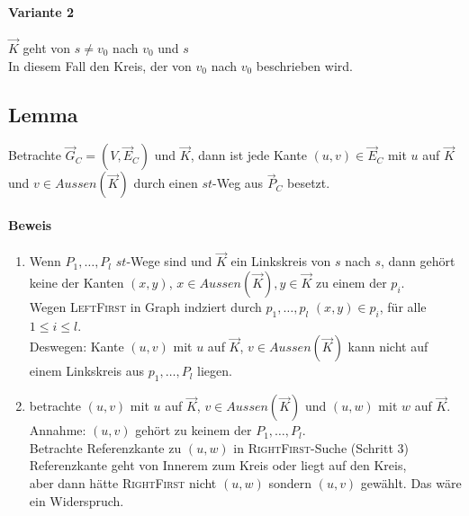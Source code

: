 \documentclass{article}
\begin{document}
\paragraph{Variante 2}
$\overrightarrow{K}$ geht von $s \neq v_0$ nach $v_0$ und $s$\\
In diesem Fall den Kreis, der von $v_0$ nach $v_0$ beschrieben wird.

\subsection{Lemma}
Betrachte $\overrightarrow{G}_C = (V,\overrightarrow{E}_C)$ und $\overrightarrow{K}$, dann ist jede Kante $(u,v) \in \overrightarrow{E}_C$ mit $u$ auf $\overrightarrow{K}$ und $v \in Aussen(\overrightarrow{K})$ durch einen $st$-Weg aus $\overrightarrow{P}_C$ besetzt.

\paragraph{Beweis}
\begin{enumerate}
	\item Wenn $P_1,\ldots, P_l$ $st$-Wege sind und $\overrightarrow{K}$ ein Linkskreis von $s$ nach $s$, dann gehört keine der Kanten $(x,y)$, $x \in Aussen(\overrightarrow{K}), y \in \overrightarrow{K}$ zu einem der $p_i$.\\
	Wegen \textsc{LeftFirst} in Graph indziert durch $p_1,\ldots, p_l$ $(x,y) \in p_i$, für alle $1 \leq i \leq l$.\\
	Deswegen: Kante $(u,v)$ mit $u$ auf $\overrightarrow{K}$, $v \in Aussen(\overrightarrow{K})$ kann nicht auf einem Linkskreis aus $p_1,\ldots, P_l$ liegen.
	
	\item betrachte $(u,v)$ mit $u$ auf $\overrightarrow{K}$, $v \in Aussen(\overrightarrow{K})$ und $(u,w)$ mit $w$ auf $\overrightarrow{K}$.\\
	Annahme: $(u,v)$ gehört zu keinem der $P_1, \ldots, P_l$.\\
	Betrachte Referenzkante zu $(u,w)$ in \textsc{RightFirst}-Suche (Schritt 3)\\
	Referenzkante geht von Innerem zum Kreis oder liegt auf den Kreis,\\
	aber dann hätte \textsc{RightFirst} nicht $(u,w)$ sondern $(u,v)$ gewählt. Das wäre ein Widerspruch.
\end{enumerate}
\end{document}
